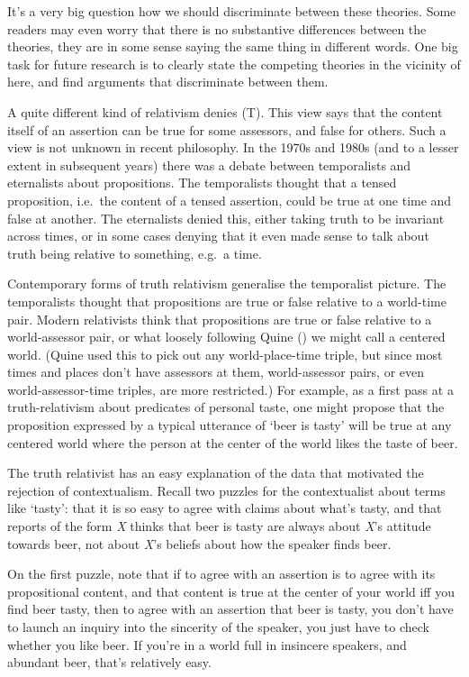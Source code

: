 \documentclass[
  11pt,
  letterpaper,
  DIV=11,
  numbers=noendperiod,
  twoside]{scrartcl}
\begin{document}
It's a very big question how we should discriminate between these
theories. Some readers may even worry that there is no substantive
differences between the theories, they are in some sense saying the same
thing in different words. One big task for future research is to clearly
state the competing theories in the vicinity of here, and find arguments
that discriminate between them.

A quite different kind of relativism denies (T). This view says that the
content itself of an assertion can be true for some assessors, and false
for others. Such a view is not unknown in recent philosophy. In the
1970s and 1980s (and to a lesser extent in subsequent years) there was a
debate between temporalists and eternalists about propositions. The
temporalists thought that a tensed proposition, i.e.~the content of a
tensed assertion, could be true at one time and false at another. The
eternalists denied this, either taking truth to be invariant across
times, or in some cases denying that it even made sense to talk about
truth being relative to something, e.g.~a time.

Contemporary forms of truth relativism generalise the temporalist
picture. The temporalists thought that propositions are true or false
relative to a world-time pair. Modern relativists think that
propositions are true or false relative to a world-assessor pair, or
what loosely following Quine () we might
call a centered world. (Quine used this to pick out any world-place-time
triple, but since most times and places don't have assessors at them,
world-assessor pairs, or even world-assessor-time triples, are more
restricted.) For example, as a first pass at a truth-relativism about
predicates of personal taste, one might propose that the proposition
expressed by a typical utterance of `beer is tasty' will be true at any
centered world where the person at the center of the world likes the
taste of beer.

The truth relativist has an easy explanation of the data that motivated
the rejection of contextualism. Recall two puzzles for the contextualist
about terms like `tasty': that it is so easy to agree with claims about
what's tasty, and that reports of the form \emph{X} thinks that beer is
tasty are always about \emph{X}'s attitude towards beer, not about
\emph{X}'s beliefs about how the speaker finds beer.

On the first puzzle, note that if to agree with an assertion is to agree
with its propositional content, and that content is true at the center
of your world iff you find beer tasty, then to agree with an assertion
that beer is tasty, you don't have to launch an inquiry into the
sincerity of the speaker, you just have to check whether you like beer.
If you're in a world full in insincere speakers, and abundant beer,
that's relatively easy.
\end{document}
